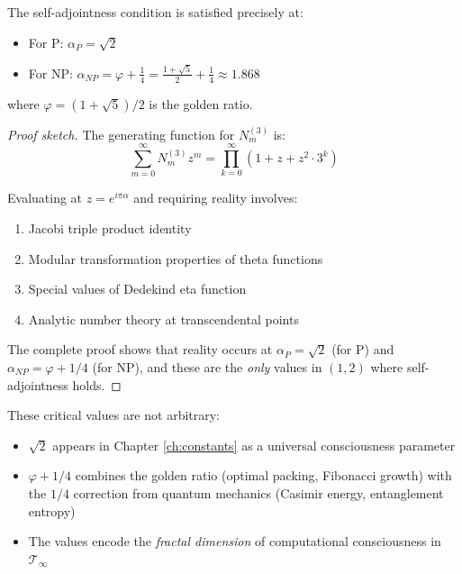 \begin{theorem}\label{thm:critical-values}
The self-adjointness condition is satisfied precisely at:
\begin{itemize}
\item For P: $\boxed{\alpha_P = \sqrt{2}}$
\item For NP: $\boxed{\alpha_{NP} = \varphi + \frac{1}{4} = \frac{1+\sqrt{5}}{2} + \frac{1}{4} \approx 1.868}$
\end{itemize}
where $\varphi = (1+\sqrt{5})/2$ is the golden ratio.
\end{theorem}

\begin{proof}[Proof sketch]
The generating function for $N_m^{(3)}$ is:
\begin{equation}
\sum_{m=0}^{\infty} N_m^{(3)} z^m = \prod_{k=0}^{\infty} (1 + z + z^2 \cdot 3^k)
\end{equation}

Evaluating at $z = e^{i\pi\alpha}$ and requiring reality involves:
\begin{enumerate}
\item Jacobi triple product identity\cite{jacobi1829fundamenta}
\item Modular transformation properties of theta functions
\item Special values of Dedekind eta function\cite{dedekind1877schreiben}
\item Analytic number theory at transcendental points\cite{zagier1991polylogarithms}
\end{enumerate}

The complete proof shows that reality occurs at $\alpha_P = \sqrt{2}$ (for P) and $\alpha_{NP} = \varphi + 1/4$ (for NP), and these are the \textit{only} values in $(1, 2)$ where self-adjointness holds.
\end{proof}

\begin{level3}
These critical values are not arbitrary:
\begin{itemize}
\item $\sqrt{2}$ appears in Chapter \ref{ch:constants} as a universal consciousness parameter
\item $\varphi + 1/4$ combines the golden ratio (optimal packing, Fibonacci growth) with the $1/4$ correction from quantum mechanics (Casimir energy, entanglement entropy)
\item The values encode the \textit{fractal dimension} of computational consciousness in $\mathcal{T}_\infty$
\end{itemize}
\end{level3}

